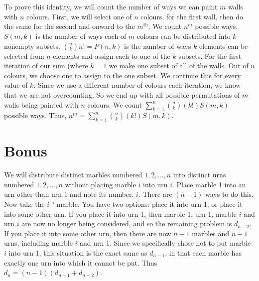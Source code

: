 \documentclass{article}
\begin{document}
\section{} %
To prove this identity, we will count the number of ways we can paint $m$ walls
with $n$ colours.
\newline
\newline
First, we will select one of $n$ colours, for the first wall, then do the same
for the second and onward to the $m^{\text{th}}$. We count $n^m$ possible ways.
\newline
\newline
$S(m,k)$ is the number of ways each of $m$ colours can be distributed into $k$
nonempty subsets.
\newline
\newline
$\binom{n}{k}n!=P(n,k)$ is the number of ways $k$ elements can be selected from
$n$ elements and assign each to one of the $k$ subsets.
\newline
\newline
For the first iteration of our sum (where $k=1$ we make one subset of all of
the walls. Out of $n$ colours, we choose one to assign to the one subset.
\newline
We continue this for every value of $k$. Since we use a different number of
colours each iteration, we know that we are not overcounting. So we end up
with all possible permutations of $m$ walls being painted with $n$ colours.
We count $\sum_{k=1}^{n}\binom{n}{k}(k!)S(m,k)$ possible ways.
\newline
\newline
Thus, $n^m=\sum_{k=1}^{n}\binom{n}{k}(k!)S(m,k)$.
\section{Bonus} %
We will distribute distinct marbles numbered $1,2,\ldots,n$ into distinct urns
numbered $1,2,\ldots,n$ without placing marble $i$ into urn $i$.
\newline
\newline
Place marble 1 into an urn other than urn 1 and note its number, $i$. There are
$(n-1)$ ways to do this. Now take the $i^{\text{th}}$ marble. You have two
options: place it into urn 1, or place it into some other urn. If you place it
into urn 1, then marble 1, urn 1, marble $i$ and urn $i$ are now no longer
being considered, and so the remaining problem is $d_{n-2}$. If you place it
into some other urn, then there are now $n-1$ marbles and $n-1$ urns, including
marble $i$ and urn 1. Since we specifically chose not to put marble $i$ into
urn 1, this situation is the exact same as $d_{n-1}$, in that each marble has
exactly one urn into which it cannot be put. Thus $d_n=(n-1)(d_{n-1}+d_{n-2})$.
\end{document}
